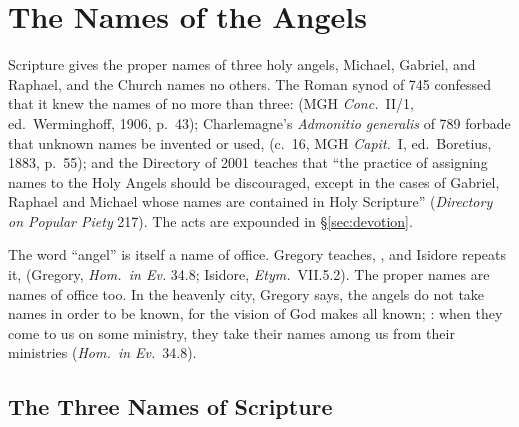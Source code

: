 \section{The Names of the Angels}\label{app:names}

Scripture gives the proper names of three holy angels, Michael, Gabriel,
and Raphael, and the Church names no others. The Roman synod of 745 confessed
that it knew the names of no more than three:  (MGH
\emph{Conc.}\ II/1, ed.\ Werminghoff, 1906, p.~43); Charlemagne's \emph{Admonitio
generalis} of 789 forbade that unknown names be invented or used,
 (c.~16, MGH \emph{Capit.}\ I, ed.\ Boretius, 1883, p.~55); and the
Directory of 2001 teaches that ``the practice of assigning names to the
Holy Angels should be discouraged, except in the cases of Gabriel,
Raphael and Michael whose names are contained in Holy Scripture''
(\emph{Directory on Popular Piety} 217). The acts are expounded in
\S\ref{sec:devotion}.

The word ``angel'' is itself a name of office. Gregory teaches,
, and Isidore
repeats it, 
(Gregory, \emph{Hom.\ in Ev.} 34.8; Isidore, \emph{Etym.}\ VII.5.2).
The proper names are names of office too. In the heavenly city, Gregory
says, the angels do not take names in order to be known, for the vision
of God makes all known; : when they come to
us on some ministry, they take their names among us from their
ministries (\emph{Hom.\ in Ev.}\ 34.8).

\subsection*{The Three Names of Scripture}

